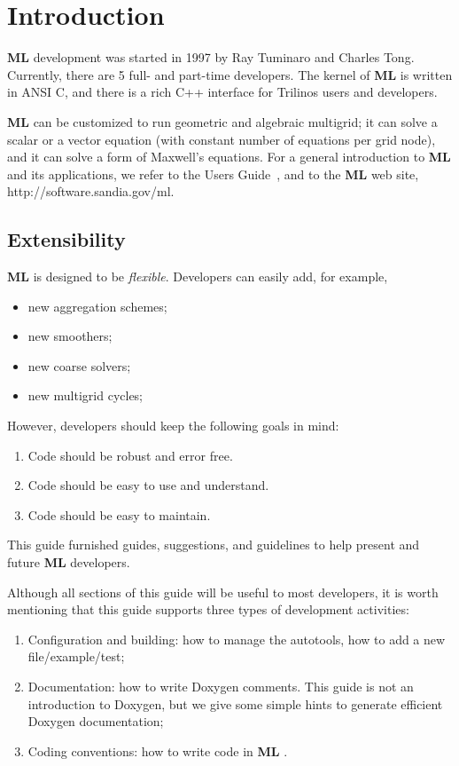 \documentclass[10pt,letter,relax]{SANDreport}
\newcommand{\ML}     {{\bf ML }}
\begin{document}
\clearpage
\newpage


\section{Introduction}

\ML development was started in 1997 by Ray Tuminaro and Charles Tong.
Currently, there are 5 full- and part-time developers.
The kernel of \ML is written in ANSI C, and there is a rich C++ interface
for Trilinos users and developers. 

\ML can be customized to run geometric and algebraic multigrid; it can
solve a scalar or a vector equation (with constant number of equations
per grid node), and it can solve a form of Maxwell's equations.
For a general
introduction to \ML and its applications, we refer to the Users
Guide~\cite{ml_users_guide}, and to the \ML web site,
http://software.sandia.gov/ml. 

\subsection{Extensibility}
\label{extensibility}
%
\ML is designed to be {\sl flexible}. Developers can easily add, for example,
\begin{itemize}
\item new aggregation schemes;
\item new smoothers;
\item new coarse solvers;
\item new multigrid cycles;
\end{itemize}
However, developers should keep the following goals in mind:
\begin{enumerate}
\item Code should be robust and error free.
\item Code should be easy to use and understand.
\item Code should be easy to maintain.
\end{enumerate}
This guide furnished guides, suggestions, and guidelines to help present and
future \ML developers. 

Although all sections of this guide will be useful to most developers,
it is worth mentioning that this guide supports three types of
development activities:
\begin{enumerate}
\item Configuration and building: how to manage the autotools, how to
  add a new file/example/test;
\item Documentation: how to write Doxygen comments. This guide is not an
  introduction to Doxygen, but we give some simple hints to generate
  efficient Doxygen documentation;
\item Coding conventions: how to write code in \ML.
\end{enumerate}
\end{document}
